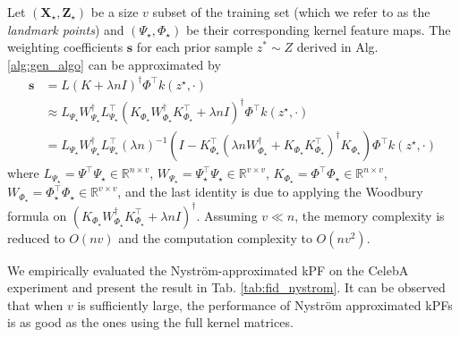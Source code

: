 Let $(\mathbf{X_\star}, \mathbf{Z_\star})$ be a size $v$ subset of the training set (which we refer to as the \textit{landmark points}) and $(\Psi_\star, \Phi_\star)$ be their corresponding kernel feature maps. The weighting coefficients $\mathbf{s}$ for each prior sample $z^* \sim Z$ derived in Alg. \ref{alg:gen_algo} can be approximated by
\begin{align}
    \nonumber\mathbf{s} &= L (K + \lambda nI)^\dagger \Phi^\top k(z^\star, \cdot) \\\nonumber
    &\approx L_{\Psi_\star} W_{\Psi_\star}^\dagger L_{\Psi_\star}^\top (K_{\Phi_\star} W_{\Phi_\star}^\dagger K_{\Phi_\star}^\top + \lambda nI)^\dagger \Phi^\top k(z^\star, \cdot) \\
    &= L_{\Psi_\star} W_{\Psi_\star}^\dagger L_{\Psi_\star}^\top (\lambda n)^{-1}(I - K_{\Phi_\star}^\top(\lambda n W_{\Phi_\star}^\dagger + K_{\Phi_\star} K_{\Phi_\star}^\top)^\dagger K_{\Phi_\star}) \Phi^\top k(z^\star, \cdot)
\end{align}
where $L_{\Psi_\star} = \Psi^\top \Psi_\star \in \mathbb{R}^{n \times v}$, $W_{\Psi_\star} = \Psi_\star^\top \Psi_\star \in \mathbb{R}^{v \times v}$, $K_{\Phi_\star} = \Phi^\top \Phi_\star \in \mathbb{R}^{n \times v}$, $W_{\Phi_\star} = \Phi_\star ^\top \Phi_\star \in \mathbb{R}^{v \times v}$, and the last identity is due to applying the Woodbury formula on $(K_{\Phi_\star} W_{\Phi_\star}^\dagger K_{\Phi_\star}^\top + \lambda nI)^\dagger$. Assuming $v \ll n$, the memory complexity is reduced to $O(nv)$ and the computation complexity to $O(nv^2)$.

We empirically evaluated the Nystr\"om-approximated kPF on the CelebA experiment and present the result in Tab. \ref{tab:fid_nystrom}. It can be observed that when $v$ is sufficiently large, the performance of Nystr\"om approximated kPFs is as good as 
the ones using the full kernel matrices.

